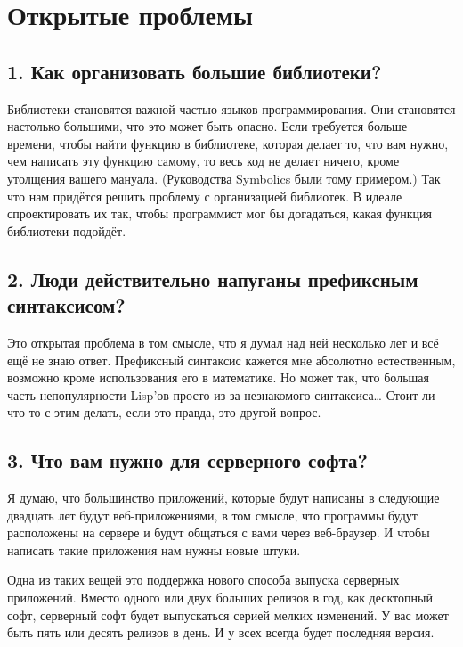 \documentclass[ebook,12pt,oneside,openany]{memoir}
\begin{document}
\section*{Открытые проблемы}

\subsection{1. Как организовать большие библиотеки?}

Библиотеки становятся важной частью языков программирования. Они
становятся настолько большими, что это может быть опасно. Если
требуется больше времени, чтобы найти функцию в библиотеке, которая
делает то, что вам нужно, чем написать эту функцию самому, то весь код
не делает ничего, кроме утолщения вашего мануала. (Руководства
Symbolics были тому примером.) Так что нам придётся решить проблему с
организацией библиотек. В идеале спроектировать их так, чтобы
программист мог бы догадаться, какая функция библиотеки подойдёт. \newline

\subsection{2. Люди действительно напуганы префиксным синтаксисом?}

Это открытая проблема в том смысле, что я думал над ней несколько лет
и всё ещё не знаю ответ. Префиксный синтаксис кажется мне абсолютно
естественным, возможно кроме использования его в математике. Но может
так, что большая часть непопулярности Lisp'ов просто из-за незнакомого
синтаксиса… Стоит ли что-то с этим делать, если это правда, это другой
вопрос. \newline

\subsection{3. Что вам нужно для серверного софта?}

Я думаю, что большинство приложений, которые будут написаны в
следующие двадцать лет будут веб-приложениями, в том смысле, что
программы будут расположены на сервере и будут общаться с вами через
веб-браузер. И чтобы написать такие приложения нам нужны новые штуки. \newline

Одна из таких вещей это поддержка нового способа выпуска серверных
приложений. Вместо одного или двух больших релизов в год, как
десктопный софт, серверный софт будет выпускаться серией мелких
изменений. У вас может быть пять или десять релизов в день. И у всех
всегда будет последняя версия. \newline
\end{document}
